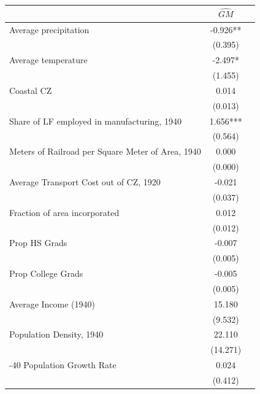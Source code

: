  \begin{tabular}{l*{2}{c}} \toprule
                &\multicolumn{1}{c}{$\widehat{GM}$}\\
\midrule
Average precipitation&   -0.926** \\
                &  (0.395)   \\
\addlinespace
Average temperature&   -2.497*  \\
                &  (1.455)   \\
\addlinespace
Coastal CZ      &    0.014   \\
                &  (0.013)   \\
\addlinespace
Share of LF employed in manufacturing, 1940&    1.656***\\
                &  (0.564)   \\
\addlinespace
Meters of Railroad per Square Meter of Area, 1940&    0.000   \\
                &  (0.000)   \\
\addlinespace
Average Transport Cost out of CZ, 1920&   -0.021   \\
                &  (0.037)   \\
\addlinespace
Fraction of area incorporated&    0.012   \\
                &  (0.012)   \\
\addlinespace
Prop HS Grads   &   -0.007   \\
                &  (0.005)   \\
\addlinespace
Prop College Grads&   -0.005   \\
                &  (0.005)   \\
\addlinespace
Average Income (1940)&   15.180   \\
                &  (9.532)   \\
\addlinespace
Population Density, 1940&   22.110   \\
                & (14.271)   \\
\addlinespace
1930-40 Population Growth Rate&    0.024   \\
                &  (0.412)   \\
       \bottomrule \end{tabular}

